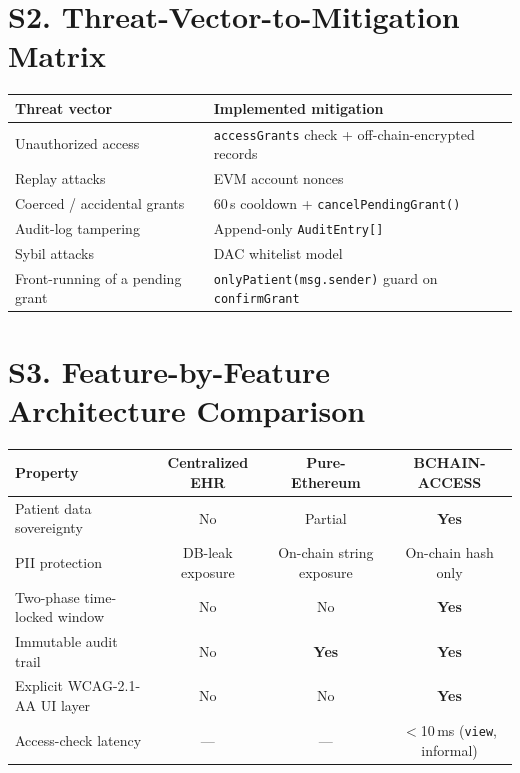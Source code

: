 \documentclass[10pt]{article}
\newcommand{\yes}{\textcolor{green!55!black}{\textbf{Yes}}}
\newcommand{\no}{\textcolor{red!70!black}{No}}
\begin{document}
\section*{S2. Threat-Vector-to-Mitigation Matrix}
\begin{center}\small\begin{tabular}{|l|l|}
\hline\textbf{Threat vector} & \textbf{Implemented mitigation}\\\hline
Unauthorized access & \texttt{accessGrants} check + off-chain-encrypted records\\\hline
Replay attacks & EVM account nonces\\\hline
Coerced / accidental grants & 60\,s cooldown + \texttt{cancelPendingGrant()}\\\hline
Audit-log tampering & Append-only \texttt{AuditEntry[]}\\\hline
Sybil attacks & DAC whitelist model\\\hline
Front-running of a pending grant & \texttt{onlyPatient(msg.sender)} guard on \texttt{confirmGrant}\\\hline
\end{tabular}\end{center}

\section*{S3. Feature-by-Feature Architecture Comparison}
\begin{center}\small\begin{tabular}{|l|c|c|c|}
\hline\textbf{Property} & \textbf{Centralized EHR} & \textbf{Pure-Ethereum} & \textbf{BCHAIN-ACCESS}\\\hline
Patient data sovereignty & \no & Partial & \yes\\\hline
PII protection & DB-leak exposure & On-chain string exposure & On-chain hash only\\\hline
Two-phase time-locked window & \no & \no & \yes\\\hline
Immutable audit trail & \no & \yes & \yes\\\hline
Explicit WCAG-2.1-AA UI layer & \no & \no & \yes\\\hline
Access-check latency & --- & --- & $<$10\,ms (\texttt{view}, informal)\\\hline
\end{tabular}\end{center}
\end{document}
